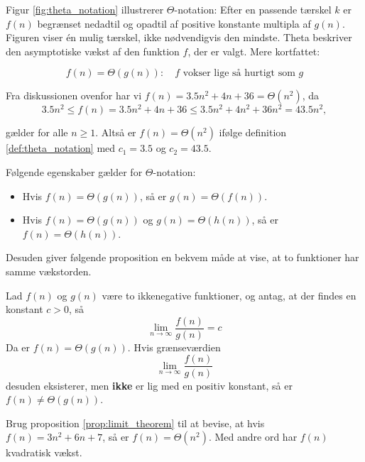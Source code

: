 Figur \ref{fig:theta_notation} illustrerer $\Theta$-notation: Efter en passende tærskel $k$ er $f(n)$ begrænset nedadtil og opadtil af positive konstante multipla af $g(n)$. Figuren viser én mulig tærskel, ikke nødvendigvis den mindste. Theta beskriver den asymptotiske vækst af den funktion $f$, der er valgt. Mere kortfattet:

\[
f(n)=\Theta(g(n)): \quad f \text { vokser lige så hurtigt som } g
\]

\begin{example}

    Fra diskussionen ovenfor har vi $f(n)=3.5 n^2+4 n+36=\Theta\left(n^2\right)$, da
    \[
    3.5 n^2 \leq f(n)=3.5 n^2+4 n+36 \leq 3.5 n^2+4 n^2+36 n^2=43.5 n^2,
    \]

gælder for alle $n \geq 1$. Altså er $f(n)=\Theta\left(n^2\right)$ ifølge definition \ref{def:theta_notation} med $c_1=3.5$ og $c_2=43.5$.
\end{example}

Følgende egenskaber gælder for $\Theta$-notation:

\begin{itemize}
    \item Hvis $f(n) = \Theta(g(n))$, så er $g(n) = \Theta(f(n))$.
    \item Hvis $f(n) = \Theta(g(n))$ og $g(n) = \Theta(h(n))$, så er $f(n) = \Theta(h(n))$.
\end{itemize}

Desuden giver følgende proposition en bekvem måde at vise, at to funktioner har samme
vækstorden.

\begin{proposition} \label{prop:limit_theorem}
    Lad $f(n)$ og $g(n)$ være to ikkenegative funktioner, og antag, at der findes en konstant $c>0$, så
    \medskip
    \[
    \lim _{n \rightarrow \infty} \frac{f(n)}{g(n)}=c
    \]
    \medskip
    Da er $f(n)=\Theta(g(n))$. Hvis grænseværdien
    \medskip
    \[
    \lim _{n \rightarrow \infty} \frac{f(n)}{g(n)}
    \]
    \medskip
    desuden eksisterer, men \textbf{ikke} er lig med en positiv konstant, så er $f(n) \neq \Theta(g(n))$.
\end{proposition}

\begin{example}
    Brug proposition \ref{prop:limit_theorem} til at bevise, at hvis $f(n)=3 n^2+6 n+7$, så er $f(n)=\Theta\left(n^2\right)$. Med andre ord har $f(n)$ kvadratisk vækst.
\end{example}

